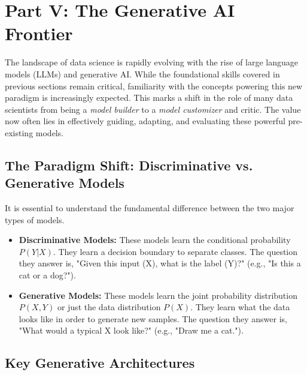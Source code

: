 \documentclass[11pt,a4paper]{article}
\begin{document}
\section{Part V: The Generative AI Frontier}

The landscape of data science is rapidly evolving with the rise of large language models (LLMs) and generative AI. While the foundational skills covered in previous sections remain critical, familiarity with the concepts powering this new paradigm is increasingly expected. This marks a shift in the role of many data scientists from being a \textit{model builder} to a \textit{model customizer} and critic. The value now often lies in effectively guiding, adapting, and evaluating these powerful pre-existing models.

\subsection{The Paradigm Shift: Discriminative vs. Generative Models}

It is essential to understand the fundamental difference between the two major types of models.
\begin{itemize}
    \item \textbf{Discriminative Models:} These models learn the conditional probability $P(Y|X)$. They learn a decision boundary to separate classes. The question they answer is, "Given this input (X), what is the label (Y)?" (e.g., "Is this a cat or a dog?").
    \item \textbf{Generative Models:} These models learn the joint probability distribution $P(X, Y)$ or just the data distribution $P(X)$. They learn what the data looks like in order to generate new samples. The question they answer is, "What would a typical X look like?" (e.g., "Draw me a cat.").
\end{itemize}

\subsection{Key Generative Architectures}
\end{document}
